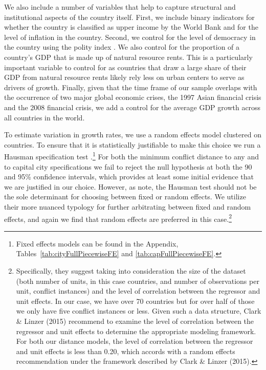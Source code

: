 We also include a number of variables that help to capture structural and institutional aspects of the country itself. First, we include binary indicators for whether the country is classified as upper income by the World Bank and for the level of inflation in the country. Second, we control for the level of democracy in the country using the polity index \citep{marshall:etal:2013}. We also control for the proportion of a country's GDP that is made up of natural resource rents. This is a particularly important variable to control for as countries that draw a large share of their GDP from natural resource rents likely rely less on urban centers to serve as drivers of growth. Finally, given that the time frame of our sample overlaps with the occurrence of two major global economic crises, the 1997 Asian financial crisis and the 2008 financial crisis, we add a control for the average GDP growth across all countries in the world. 

To estimate variation in growth rates, we use a random effects model clustered on countries. To ensure that it is statistically justifiable to make this choice we run a Hausman specification test \citep{greene:2008}.\footnote{Fixed effects models can be found in the Appendix, Tables~\ref{tab:cityFullPiecewiseFE} and \ref{tab:capFullPiecewiseFE}.} For both the minimum conflict distance to any and to capital city specifications we fail to reject the null hypothesis at both the 90 and 95\% confidence intervals, which provides at least some initial evidence that we are justified in our choice. However, as \citet{clark:linzer:2015} note, the Hausman test should not be the sole determinant for choosing between fixed or random effects. We utilize their more nuanced typology for further arbitrating between fixed and random effects, and again we find that random effects are preferred in this case.\footnote{Specifically, they suggest taking into consideration the size of the dataset (both number of units, in this case countries, and number of observations per unit, conflict instances) and the level of correlation between the regressor and unit effects. In our case, we have over 70 countries but for over half of those we only have five conflict instances or less. Given such a data structure, Clark \& Linzer (2015) recommend to examine the level of correlation between the regressor and unit effects to determine the appropriate modeling framework. For both our distance models, the level of correlation between the regressor and unit effects is less than 0.20, which accords with a random effects recommendation under the framework described by Clark \& Linzer (2015).}

